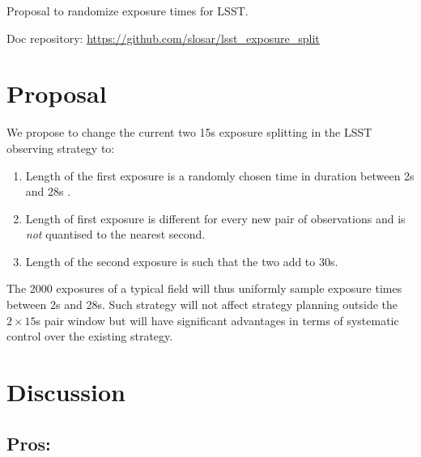 \documentclass[12pt, a4paper]{article}
\begin{document}
\begin{center}
{\Huge
  Proposal to randomize exposure times for LSST.
}
\end{center}



{\small
Doc repository: \url{https://github.com/slosar/lsst_exposure_split}
}

\section*{Proposal}

We propose to change the current two 15s exposure splitting in the
LSST observing strategy to:

\begin{enumerate}
\item Length of the first exposure is a randomly chosen time in
  duration between 2s and 28s .

\item Length of first exposure is different for every new pair of
  observations and is \emph{not} quantised to the nearest second.

\item Length of the second exposure is such that the two add to 30s.
\end{enumerate}

The 2000 exposures of a typical field will thus uniformly sample
exposure times between 2s and 28s. Such strategy will not affect
strategy planning outside the $2\times 15$s pair window but will have significant
advantages in terms of systematic control over the existing strategy.

\section*{Discussion}

\subsection*{Pros:}
\end{document}
